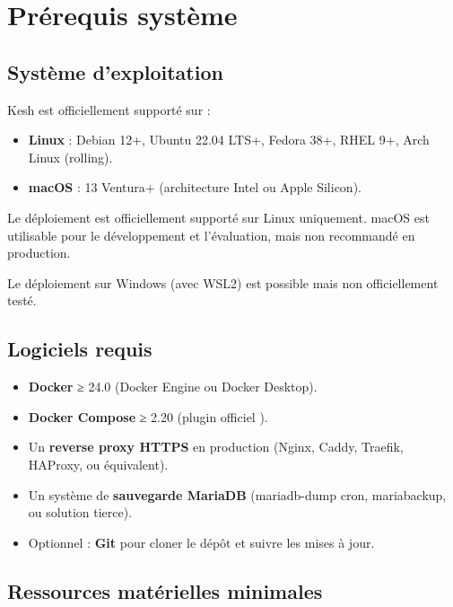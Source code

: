 \documentclass[a4paper,11pt,oneside]{article}
\begin{document}
\section{Prérequis système}

\subsection{Système d'exploitation}

Kesh est officiellement supporté sur :

\begin{itemize}
    \item \textbf{Linux} : Debian 12+, Ubuntu 22.04 LTS+, Fedora 38+, RHEL 9+, Arch Linux (rolling).
    \item \textbf{macOS} : 13 Ventura+ (architecture Intel ou Apple Silicon).
\end{itemize}

Le déploiement est officiellement supporté sur Linux uniquement. macOS est utilisable pour le développement et l'évaluation, mais non recommandé en production.

Le déploiement sur Windows (avec WSL2) est possible mais non officiellement testé.

\subsection{Logiciels requis}

\begin{itemize}
    \item \textbf{Docker} ≥ 24.0 (Docker Engine ou Docker Desktop).
    \item \textbf{Docker Compose} ≥ 2.20 (plugin officiel ).
    \item Un \textbf{reverse proxy HTTPS} en production (Nginx, Caddy, Traefik, HAProxy, ou équivalent).
    \item Un système de \textbf{sauvegarde MariaDB} (mariadb-dump cron, mariabackup, ou solution tierce).
    \item Optionnel : \textbf{Git} pour cloner le dépôt et suivre les mises à jour.
\end{itemize}

\subsection{Ressources matérielles minimales}
\end{document}

